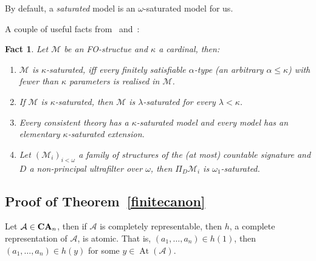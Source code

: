 \documentclass{article}
\theoremstyle{defin}
\theoremstyle{theorem}
\theoremstyle{claim}
\theoremstyle{prop}
\theoremstyle{lemma}
\theoremstyle{fact}
\newtheorem{fact}{Fact}
\theoremstyle{remark}
\theoremstyle{ex}
\theoremstyle{col}
\theoremstyle{question}
\begin{document}
By default, a \emph{saturated} model is an $\omega$-saturated model for us.

A couple of useful facts from~\cite{chang1990model} and~\cite{hodges1993model}:

\begin{fact} Let $\mathcal{M}$ be an FO-structue and $\kappa$ a cardinal, then:
\begin{enumerate}
\item $\mathcal{M}$ is $\kappa$-saturated, iff every finitely satisfiable $\alpha$-type (an arbitrary $\alpha \leq \kappa$) with fewer than $\kappa$ parameters is realised in  $\mathcal{M}$.
\item If $\mathcal{M}$ is $\kappa$-saturated, then $\mathcal{M}$ is $\lambda$-saturated for every $\lambda < \kappa$.
\item \label{saturation} Every consistent theory has a $\kappa$-saturated model and every model has an elementary $\kappa$-saturated extension.
\item Let $(\mathcal{M}_i)_{i < \omega}$ a family of structures of the (at most) countable signature and $D$ a non-principal ultrafilter over $\omega$, then $\Pi_D \mathcal{M}_i$ is $\omega_1$-saturated.
\end{enumerate}
\end{fact}

\subsection{Proof of Theorem~\ref{finitecanon}}

Let $\mathcal{A} \in {\bf CA}_n$, then if $\mathcal{A}$ is completely representable, then $h$, a complete representation of $\mathcal{A}$, is atomic. That is, $(a_1, \dots, a_n) \in h(1)$, then $(a_1, \dots, a_n) \in h(y)$ for some $y \in \operatorname{At}(\mathcal{A})$.
\end{document}
